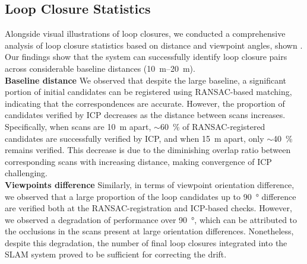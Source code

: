 \subsection*{Loop Closure Statistics}
Alongside visual illustrations of loop closures, we conducted a comprehensive analysis of loop closure statistics based on distance and viewpoint angles, shown . Our findings show that the system can successfully identify loop closure pairs across considerable baseline distances (\SIrange{10}{20}{\meter}). \\
\newline
\textbf{Baseline distance}\hspace{0.5em} We observed that despite the large baseline, a significant portion of initial candidates can be registered using RANSAC-based matching, indicating that the correspondences are accurate. However, the proportion of candidates verified by ICP decreases as the distance between scans increases. Specifically, when scans are \SI{10}{\meter} apart, $\sim$\SI{60}{\percent} of RANSAC-registered candidates are successfully verified by ICP, and when \SI{15}{\meter} apart, only $\sim$\SI{40}{\percent} remains verified. This decrease is due to the diminishing overlap ratio between corresponding scans with increasing distance, making convergence of ICP challenging. \\
\newline
\textbf{Viewpoints difference}\hspace{0.5em} Similarly, in terms of viewpoint orientation difference, we observed that a large proportion of the loop candidates up to \SI{90}{\degree} difference are verified both at the RANSAC-registration and ICP-based checks. However, we observed a degradation of performance over \SI{90}{\degree}, which can be attributed to the occlusions in the scans present at large orientation differences. Nonetheless, despite this degradation, the number of final loop closures integrated into the SLAM system proved to be sufficient for correcting the drift.   

